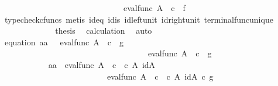 \begin{isabellebody}
\ \ \ \ \ \ \ \ \ \ \ \ \ \ \ \ \ \ \ \ \ \ \ \ \ \ \ \ \ \ eval{\isacharunderscore}{\kern0pt}func\ A\ {\isasymOmega}\ {\isasymcirc}\isactrlsub c\ {\isasymlangle}{\isasymf}{\isacharcomma}{\kern0pt}\ f{\isasymrangle}{\isasymrangle}{\isachardoublequoteclose}\ \ \ \ \isanewline
\ \ \ \ \ \ \ \ \ \ \ \ \isamarkupfalse%
\ {\isacharparenleft}{\kern0pt}typecheck{\isacharunderscore}{\kern0pt}cfuncs{\isacharcomma}{\kern0pt}\ metis\ id{}{\isacharunderscore}{\kern0pt}eq\ id{}{\isacharunderscore}{\kern0pt}is\ id{\isacharunderscore}{\kern0pt}left{\isacharunderscore}{\kern0pt}unit{}\ id{\isacharunderscore}{\kern0pt}right{\isacharunderscore}{\kern0pt}unit{}\ terminal{\isacharunderscore}{\kern0pt}func{\isacharunderscore}{\kern0pt}unique{\isacharparenright}{\kern0pt}\isanewline
\ \ \ \ \ \ \ \ \ \ \isamarkupfalse%
\ \isamarkupfalse%
\ {\isacharquery}{\kern0pt}thesis\ \isamarkupfalse%
\ calculation\ \isamarkupfalse%
\ auto\isanewline
\ \ \ \ \ \ \ \ \isamarkupfalse%
\isanewline
\ \ \ \ \ \ \ \ \isamarkupfalse%
\ equation{}{\isacharcolon}{\kern0pt}\ {\isachardoublequoteopen}{\isasymlangle}a{}{\isacharcomma}{\kern0pt}a{}{\isasymrangle}\ {\isacharequal}{\kern0pt}\ \ {\isasymlangle}eval{\isacharunderscore}{\kern0pt}func\ A\ {\isasymOmega}\ {\isasymcirc}\isactrlsub c\ {\isasymlangle}{\isasymt}{\isacharcomma}{\kern0pt}\ g{\isasymrangle}{\isacharcomma}{\kern0pt}\isanewline
\ \ \ \ \ \ \ \ \ \ \ \ \ \ \ \ \ \ \ \ \ \ \ \ \ \ \ \ \ \ \ \ \ \ \ \ eval{\isacharunderscore}{\kern0pt}func\ A\ {\isasymOmega}\ {\isasymcirc}\isactrlsub c\ {\isasymlangle}{\isasymf}{\isacharcomma}{\kern0pt}\ g{\isasymrangle}{\isasymrangle}{\isachardoublequoteclose}\isanewline
\ \ \ \ \ \ \ \ \isamarkupfalse%
\ {\isacharminus}{\kern0pt}\ \isanewline
\ \ \ \ \ \ \ \ \ \ \isamarkupfalse%
\ {\isachardoublequoteopen}{\isasymlangle}a{}{\isacharcomma}{\kern0pt}a{}{\isasymrangle}\ {\isacharequal}{\kern0pt}\ {\isasymlangle}eval{\isacharunderscore}{\kern0pt}func\ A\ {\isasymOmega}\ {\isasymcirc}\isactrlsub c\ {\isasymlangle}{\isasymt}\ {\isasymcirc}\isactrlsub c\ {\isasymbeta}\isactrlbsub A\isactrlbsup {\isasymOmega}\isactrlesup \isactrlesub {\isacharcomma}{\kern0pt}\ id{\isacharparenleft}{\kern0pt}A\isactrlbsup {\isasymOmega}\isactrlesup {\isacharparenright}{\kern0pt}{\isasymrangle}{\isacharcomma}{\kern0pt}\isanewline
\ \ \ \ \ \ \ \ \ \ \ \ \ \ \ \ \ \ \ \ \ \ \ \ \ \ eval{\isacharunderscore}{\kern0pt}func\ A\ {\isasymOmega}\ {\isasymcirc}\isactrlsub c\ {\isasymlangle}{\isasymf}\ {\isasymcirc}\isactrlsub c\ {\isasymbeta}\isactrlbsub A\isactrlbsup {\isasymOmega}\isactrlesup \isactrlesub {\isacharcomma}{\kern0pt}\ id{\isacharparenleft}{\kern0pt}A\isactrlbsup {\isasymOmega}\isactrlesup {\isacharparenright}{\kern0pt}{\isasymrangle}{\isasymrangle}\ {\isasymcirc}\isactrlsub c\ g{\isachardoublequoteclose}\isanewline

\end{isabellebody}
